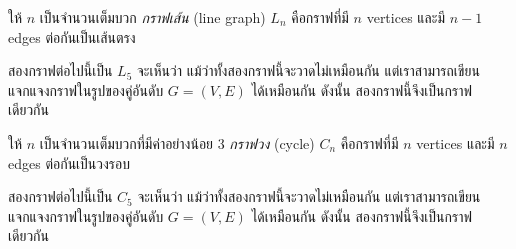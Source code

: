 \begin{definition}
ให้ $n$ เป็นจำนวนเต็มบวก \enskip \emph{กราฟเส้น} (line graph) $L_n$ คือกราฟที่มี $n$ vertices และมี $n-1$ edges ต่อกันเป็นเส้นตรง
\end{definition}
%
\begin{example}
สองกราฟต่อไปนี้เป็น $L_5$ \enskip จะเห็นว่า แม้ว่าทั้งสองกราฟนี้จะวาดไม่เหมือนกัน แต่เราสามารถเขียนแจกแจงกราฟในรูปของคู่อันดับ $G=(V,E)$ ได้เหมือนกัน ดังนั้น สองกราฟนี้จึงเป็นกราฟเดียวกัน
\begin{center}
\begin{multicols}{2}

\end{multicols}
\end{center}
\end{example}

\begin{definition}
ให้ $n$ เป็นจำนวนเต็มบวกที่มีค่าอย่างน้อย 3 \enskip \emph{กราฟวง} (cycle) $C_n$ คือกราฟที่มี $n$ vertices และมี $n$ edges ต่อกันเป็นวงรอบ
\end{definition}
%
\begin{example}
\label{ex:cycle-graph}
สองกราฟต่อไปนี้เป็น $C_5$ \enskip จะเห็นว่า แม้ว่าทั้งสองกราฟนี้จะวาดไม่เหมือนกัน แต่เราสามารถเขียนแจกแจงกราฟในรูปของคู่อันดับ $G=(V,E)$ ได้เหมือนกัน ดังนั้น สองกราฟนี้จึงเป็นกราฟเดียวกัน
\begin{center}
\begin{multicols}{2}

\end{multicols}
\end{center}
\end{example}

